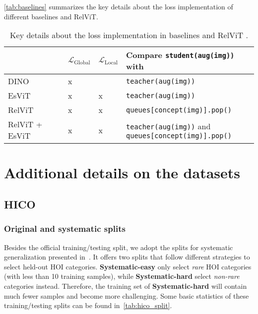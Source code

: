 \documentclass{article} \usepackage{iclr2022_conference,times}
\newcommand{\relvit}{RelViT }
\newcommand{\loss}{\mathcal{L}}
\begin{document}
\autoref{tab:baselines} summarizes the key details about the loss implementation of different baselines and RelViT.

\begin{table}[h]
\centering
\caption{Key details about the loss implementation in baselines and \relvit.}
\begin{tabular}{llll}
\toprule
               & $\loss_{\operatorname{Global}}$ & $\loss_{\operatorname{Local}}$ & Compare \texttt{student(aug(img))} with                                                 \\ \midrule
DINO           & x                               &                                                                              & \texttt{teacher(aug(img))}                                                              \\
EsViT          & x                               & x                                                                            & \texttt{teacher(aug(img))}                                                              \\
RelViT         & x                               & x                                                                            & \texttt{queues{[}concept(img){]}.pop()}                                                 \\
RelViT + EsViT & x                               & x                                                                            & \makecell[tl]{\texttt{teacher(aug(img))} and\\ \texttt{queues{[}concept(img){]}.pop()}} \\ \bottomrule
\end{tabular}
\label{tab:baselines}
\end{table}

\section{Additional details on the datasets}

\subsection{HICO}

\subsubsection{Original and systematic splits}
Besides the official training/testing split, we adopt the splits for systematic generalization presented in~\citep{vcl}. It offers two splits that follow different strategies to select held-out HOI categories. \textbf{Systematic-easy} only select \textit{rare} HOI categories (with less than 10 training samples), while \textbf{Systematic-hard} select \textit{non-rare} categories instead. Therefore, the training set of \textbf{Systematic-hard} will contain much fewer samples and become more challenging. Some basic statistics of these training/testing splits can be found in~\autoref{tab:hico_split}.
\end{document}
